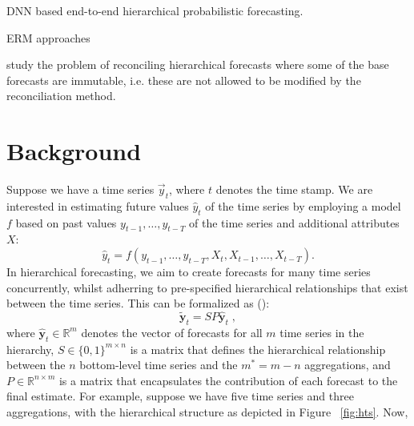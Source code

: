\documentclass{article}
\begin{document}
  \cite{rangapuram_endtoend_2021} DNN based end-to-end hierarchical probabilistic forecasting.

  \cite{bentaieb_regularized_2019} ERM approaches

  \cite{taieb_sparse_2017}

  \cite{zhang_optimal_2022} study the problem of reconciling hierarchical forecasts where some of the base forecasts are immutable, i.e. these are not allowed to be modified by the reconciliation method. 

  \cite{}

\section{Background}
  \label{sec:background}
  Suppose we have a time series \(\vec{y}_t\), where \(t\) denotes the time stamp. We are interested in estimating future values \(\hat{y}_{t}\) of the time series by employing a model \(f\) based on past values \(y_{t-1}, \dots, y_{t-T}\) of the time series and additional attributes \(X\):
  \begin{equation}
    \hat{y}_{t} = f(y_{t-1}, \dots, y_{t-T}, X_{t}, X_{t-1}, \dots, X_{t-T}).
  \end{equation}
  In hierarchical forecasting, we aim to create forecasts for many time series concurrently, whilst adherring to pre-specified hierarchical relationships that exist between the time series. This can be formalized as (\cite{hyndman_forecasting_2021}):
  \begin{equation} \label{eq:hfp}
    \tilde{\textbf{y}}_{t} = SP\hat{\textbf{y}}_{t} \;,
  \end{equation}
  where \(\hat{\textbf{y}}_{t} \in \mathbb{R}^{m} \) denotes the vector of forecasts for all \(m\) time series in the hierarchy, \(S \in \{0, 1\}^{m \times n}\) is a matrix that defines the hierarchical relationship between the \(n\) bottom-level time series and the \(m^* = m - n\) aggregations, and \(P \in \mathbb{R}^{n \times m}\) is a matrix that encapsulates the contribution of each forecast to the final estimate. For example, suppose we have five time series and three aggregations, with the hierarchical structure as depicted in Figure~
  \ref{fig:hts}. Now,
\end{document}
